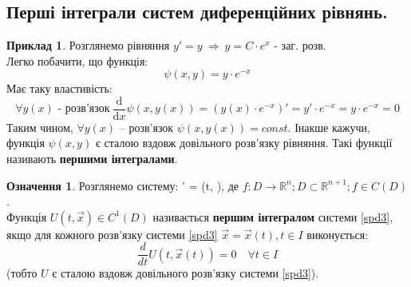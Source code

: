 \documentclass[14pt,a4paper]{scrartcl}
\theoremstyle{definition}
\newtheorem*{defo}{Означення}
\newtheorem*{example}{Приклад}
\theoremstyle{definition}
\theoremstyle{definition}
\begin{document}
\newpage

\section{}
\subsection{Перші інтеграли систем диференційних рівнянь.}
\begin{example}
 Розглянемо рівняння
 $y' = y \ \Longrightarrow \  y =  C \cdot e^x $ - заг. розв.\\
 Легко побачити, що функція:
 $$
 \psi (x,y)  = y \cdot e^{-x}
 $$
 Має таку властивість:
 $$
 \forall y(x) \text{ - розв'язок} \ \dfrac{\mathrm{d}}{\mathrm{d}x} \psi(x, y(x)) = (y(x)\cdot e^{-x})' = y' \cdot e^{-x}  = y \cdot e^{-x} = 0
 $$
 Таким чином, $\forall y(x) $ -- розв'язок $\psi (x, y(x)) = const$. Інакше кажучи, функція $\psi(x,y) $ є сталою вздовж довільного розв'язку рівняння. Такі функції називають \textbf{першими інтегралами}.
\end{example}
\begin{defo}
Розглянемо систему:
  \be\label{spd3}
  ' =  (t, ),
  \ee
  де $f: D \to \mathbb{R}^n ; D \subset \mathbb{R}^{n+1}; f \in C(D)$.\\
  Функція $U(t, \overrightarrow{x}) \in C^1 (D)$ називається \textbf{першим інтегралом} системи \eqref{spd3}, якщо для кожного розв'язку системи \eqref{spd3} $\overrightarrow{x} = \overrightarrow{x}(t), t \in I$ виконується:
$$
\frac{d}{d t} U ( t, \overrightarrow{x}(t)) = 0 \quad \forall t \in I
$$
(тобто $U$ є сталою вздовж довільного розв'язку системи \eqref{spd3}).
\end{defo}
\end{document}
